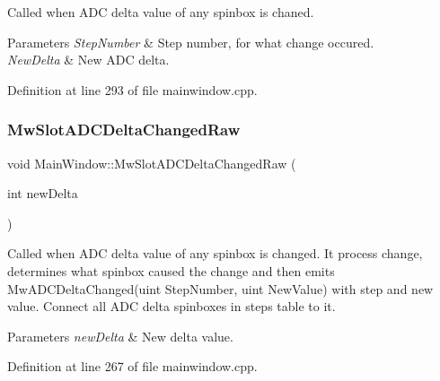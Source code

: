Called when A\+DC delta value of any spinbox is chaned. 


\begin{DoxyParams}{Parameters}
{\em Step\+Number} & Step number, for what change occured. \\
\hline
{\em New\+Delta} & New A\+DC delta. \\
\hline
\end{DoxyParams}


Definition at line 293 of file mainwindow.\+cpp.

\mbox{\label{class_main_window_acbdfd3592779f6946c4fecc33c79e9a4}} 
\subsubsection{\texorpdfstring{Mw\+Slot\+A\+D\+C\+Delta\+Changed\+Raw}{MwSlotADCDeltaChangedRaw}}
{\footnotesize\ttfamily void Main\+Window\+::\+Mw\+Slot\+A\+D\+C\+Delta\+Changed\+Raw (\begin{DoxyParamCaption}\item[{int}]{new\+Delta }\end{DoxyParamCaption})\hspace{0.3cm}{\ttfamily [slot]}}



Called when A\+DC delta value of any spinbox is changed. It process change, determines what spinbox caused the change and then emits Mw\+A\+D\+C\+Delta\+Changed(uint Step\+Number, uint New\+Value) with step and new value. Connect all A\+DC delta spinboxes in steps table to it. 


\begin{DoxyParams}{Parameters}
{\em new\+Delta} & New delta value. \\
\hline
\end{DoxyParams}


Definition at line 267 of file mainwindow.\+cpp.

\mbox{\label{class_main_window_aaf5b44955c0c93824ea89edd3cdc5730}} 
